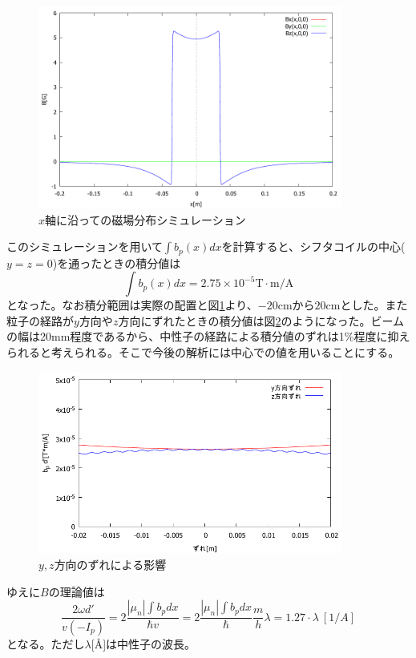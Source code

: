 \begin{figure}[h]
\centering
\includegraphics[width=10cm]{discussion/B/coil11_danmen1.pdf}
\caption{$x$軸に沿っての磁場分布シミュレーション} \label{Discussion_fig_PSS_danmen}
\end{figure}

このシミュレーションを用いて$\int b_p(x) dx$を計算すると、シフタコイルの中心($y=z=0$)を通ったときの積分値は
\begin{equation}
\int b_p(x) dx =2.75 \times 10^{-5} \mathrm{T\cdot m/A}
\end{equation}
となった。なお積分範囲は実際の配置と図\ref{Discussion_fig_PSS_danmen}より、$-20$cmから$20$cmとした。また粒子の経路が$y$方向や$z$方向にずれたときの積分値は図\ref{Discussion_fig_PSS_zure}のようになった。ビームの幅は20mm程度であるから、中性子の経路による積分値のずれは1\%程度に抑えられると考えられる。そこで今後の解析には中心での値を用いることにする。
\begin{figure}[h]
\centering
\includegraphics[width=10cm]{discussion/B/bd.pdf}
\caption{$y,z$方向のずれによる影響} \label{Discussion_fig_PSS_zure}
\end{figure}

ゆえに$B$の理論値は
\begin{equation}
\frac{2\omega d'}{v(-I_p)}=2\frac{|\mu_n|\int b_p dx}{\hbar v}=2\frac{|\mu_n|\int b_p dx}{\hbar}\frac{m}{h}\lambda=1.27 \cdot \lambda \ [1/A] \label{Discussion_theory_B}
\end{equation}
となる。ただし$\lambda$[\AA]は中性子の波長。 

